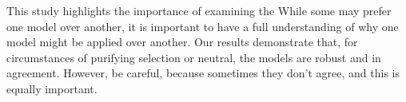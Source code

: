 \documentclass[11pt]{article}
\begin{document}



This study highlights the importance of examining the  While some may prefer one model over another, it is important to have a full understanding of why one model might be applied over another. Our results demonstrate that, for circumstances of purifying selection or neutral, the models are robust and in agreement. However, be careful, because sometimes they don't agree, and this is equally important.

\end{document}
